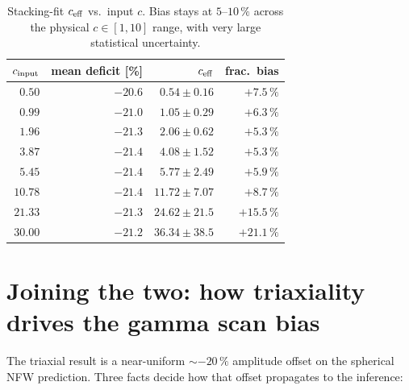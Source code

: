 \documentclass[11pt,a4paper]{article}
\newcommand{\ceff}{c_{\rm eff}}
\begin{document}
\begin{table}[htbp]
  \centering
  \begin{tabular}{rrrr}
    \toprule
    $c_{\rm input}$ & mean deficit [\%] & $\ceff$ & frac.\ bias\\
    \midrule
    $0.50$  & $-20.6$ & $0.54\pm 0.16$   & $+7.5\,\%$\\
    $0.99$  & $-21.0$ & $1.05\pm 0.29$   & $+6.3\,\%$\\
    $1.96$  & $-21.3$ & $2.06\pm 0.62$   & $+5.3\,\%$\\
    $3.87$  & $-21.4$ & $4.08\pm 1.52$   & $+5.3\,\%$\\
    $5.45$  & $-21.4$ & $5.77\pm 2.49$   & $+5.9\,\%$\\
    $10.78$ & $-21.4$ & $11.72\pm 7.07$  & $+8.7\,\%$\\
    $21.33$ & $-21.3$ & $24.62\pm 21.5$  & $+15.5\,\%$\\
    $30.00$ & $-21.2$ & $36.34\pm 38.5$  & $+21.1\,\%$\\
    \bottomrule
  \end{tabular}
  \caption{Stacking-fit $\ceff$ vs.\ input $c$.  Bias stays at
  $5$--$10\,\%$ across the physical $c\in[1,10]$ range, with very large
  statistical uncertainty.}
  \label{tab:ceff}
\end{table}

\section{Joining the two: how triaxiality drives the gamma scan bias}

The triaxial result is a near-uniform $\sim -20\,\%$ amplitude offset
on the spherical NFW prediction.  Three facts decide how that offset
propagates to the inference:
\end{document}
